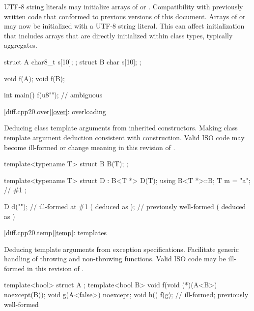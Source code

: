 \change
UTF-8 string literals may initialize arrays of  or
.
\rationale
Compatibility with previously written code that conformed to previous versions of this document.
\effect
Arrays of  or 
may now be initialized with a UTF-8 string literal.
This can affect initialization that includes arrays
that are directly initialized within class types, typically aggregates.
\begin{example}
\begin{codeblock}
struct A {
  char8_t s[10];
};
struct B {
  char s[10];
};

void f(A);
void f(B);

int main() {
  f({u8""});            // ambiguous
}
\end{codeblock}
\end{example}

[diff.cpp20.over]{\ref*{over}: overloading}

\change
Deducing class template arguments from inherited constructors.
\rationale
Making class template argument deduction consistent with construction.
\effect
Valid ISO \CppXX{} code may become ill-formed or change meaning
in this revision of \Cpp{}.
\begin{example}
\begin{codeblock}
template<typename T>
struct B {
  B(T);
};

template<typename T>
struct D : B<T *> {
  D(T);
  using B<T *>::B;
  T m = "a";    // \#1
};

D d("");        // ill-formed at \#1 ( deduced as );
                // previously well-formed ( deduced as )
\end{codeblock}
\end{example}

[diff.cpp20.temp]{\ref*{temp}: templates}

\change
Deducing template arguments from exception specifications.
\rationale
Facilitate generic handling of throwing and non-throwing functions.
\effect
Valid ISO \CppXX{} code may be ill-formed in this revision of \Cpp{}.
\begin{example}
\begin{codeblock}
template<bool> struct A { };
template<bool B> void f(void (*)(A<B>) noexcept(B));
void g(A<false>) noexcept;
void h() {
  f(g);                         // ill-formed; previously well-formed
}
\end{codeblock}
\end{example}

